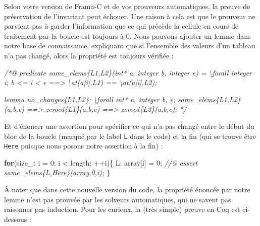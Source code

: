 \documentclass[12pt,francais,]{scrbook}
\newenvironment{Shaded}{}{}
\newcommand{\KeywordTok}[1]{\textcolor[rgb]{0.00,0.44,0.13}{\textbf{{#1}}}}
\newcommand{\DecValTok}[1]{\textcolor[rgb]{0.25,0.63,0.44}{{#1}}}
\newcommand{\CommentTok}[1]{\textcolor[rgb]{0.38,0.63,0.69}{\textit{{#1}}}}
\newcommand{\NormalTok}[1]{{#1}}
\begin{document}
Selon votre version de Frama-C et de vos prouveurs automatiques, la
preuve de préservation de l'invariant peut échouer. Une raison à cela
est que le prouveur ne parvient pas à garder l'information que ce qui
précède la cellule en cours de traitement par la boucle est toujours à
0. Nous pouvons ajouter un lemme dans notre base de connaissance,
expliquant que si l'ensemble des valeurs d'un tableau n'a pas changé,
alors la propriété est toujours vérifiée :

\begin{footnotesize}\begin{Shaded}
\begin{Highlighting}[]
\CommentTok{/*@}
\CommentTok{  predicate same_elems\{L1,L2\}(int* a, integer b, integer e) =}
\CommentTok{    \textbackslash{}forall integer i; b <= i < e ==> \textbackslash{}at(a[i],L1) == \textbackslash{}at(a[i],L2);}

\CommentTok{  lemma no_changes\{L1,L2\}:}
\CommentTok{  \textbackslash{}forall int* a, integer b, e;}
\CommentTok{  same_elems\{L1,L2\}(a,b,e) ==> zeroed\{L1\}(a,b,e) ==> zeroed\{L2\}(a,b,e);}
\CommentTok{*/}
\end{Highlighting}
\end{Shaded}\end{footnotesize}

Et d'énoncer une assertion pour spécifier ce qui n'a pas changé entre le
début du bloc de la boucle (marqué par le label \texttt{L} dans le code)
et la fin (qui se trouve être \texttt{Here} puisque nous posons notre
assertion à la fin) :

\begin{footnotesize}\begin{Shaded}
\begin{Highlighting}[]
\KeywordTok{for}\NormalTok{(size_t i = }\DecValTok{0}\NormalTok{; i < length; ++i)\{}
  \NormalTok{L:}
  \NormalTok{array[i] = }\DecValTok{0}\NormalTok{;}
  \CommentTok{//@ assert same_elems\{L,Here\}(array,0,i);}
\NormalTok{\}}
\end{Highlighting}
\end{Shaded}\end{footnotesize}

À noter que dans cette nouvelle version du code, la propriété énoncée
par notre lemme n'est pas prouvée par les solveurs automatiques, qui ne
savent pas raisonner pas induction. Pour les curieux, la (très simple)
preuve en Coq est ci-dessous :
\end{document}
